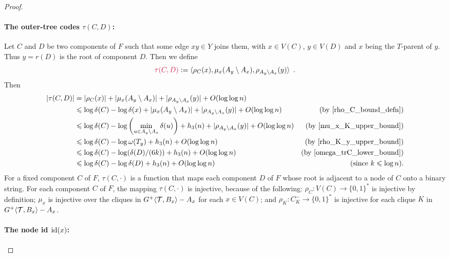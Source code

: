 \begin{proof}
  \paragraph{\boldmath The outer-tree codes $\tau(C,D)$:}
  Let $C$ and $D$ be two components of $F$ such that some edge $xy\in Y$ joins them, with $x\in V(C)$, $y\in V(D)$ and $x$ being the $T$-parent of $y$. Thus $y=r(D)$ is the root of component $D$. Then we define
  \[
     \mathdefin{\tau(C,D)}:= \langle\rho_C(x), \mu_x(A_y\setminus A_x), \rho_{A_y\setminus A_x}(y)\rangle \enspace .
  \]
  Then
  \begin{align}
    |\tau(C,D)|
      & = |\rho_C(x)| + |\mu_x(A_y\setminus A_x)| + |\rho_{A_y\setminus A_x}(y)| + \Oh(\log\log n) \nonumber \\
    & \le \log\delta(C) - \log\delta(x) + |\mu_x(A_y\setminus A_x)| + |\rho_{A_y\setminus A_x}(y)| + \Oh(\log\log n) 
      & \text{(by \cref{rho_C_bound_defn})} \nonumber \\
    &  \le \log\delta(C) - \log\left(\min_{u\in A_y\setminus A_x}\delta(u)\right) + h_3(n) + |\rho_{A_y\setminus A_x}(y)| + \Oh(\log\log n) 
      & \text{(by \cref{mu_x_K_upper_bound})} \nonumber \\
    & \le \log\delta(C) - \log\omega(T_y) + h_3(n) + \Oh(\log\log n)   
      & \text{(by \cref{rho_K_y_upper_bound})} \nonumber \\
    & \le \log\delta(C) - \log(\delta(D)/(6k)) + h_3(n) + \Oh(\log\log n)   
      & \text{(by \cref{omega_trC_lower_bound})} \nonumber \\
    & \le \log\delta(C) - \log\delta(D) + h_3(n) + \Oh(\log\log n) 
      & \text{\hspace{-1in}(since $k\le\log n$)}. \label{tau_upper_bound}
    \end{align}
    For a fixed component $C$ of $F$, $\tau(C,\cdot)$ is a function that maps each component $D$ of $F$ whose root is adjacent to a node of $C$ onto a binary string.  For each component $C$ of $F$, the mapping $\tau(C,\cdot)$ is injective, because of the following: $\rho_C:V(C)\to\{0,1\}^*$ is injective by definition; $\mu_{x}$ is injective over the cliques in ${G^+}\langle{\mathcal{T},B_x}\rangle-A_x$ for each $x\in V(C)$; and $\rho_{K}:C^-_K\to\{0,1\}^*$ is injective for each clique $K$ in ${G^+}\langle{\mathcal{T},B_x}\rangle-A_x$.

  \paragraph{\boldmath The node id $\operatorname{id}(x)$:}


\end{proof}
